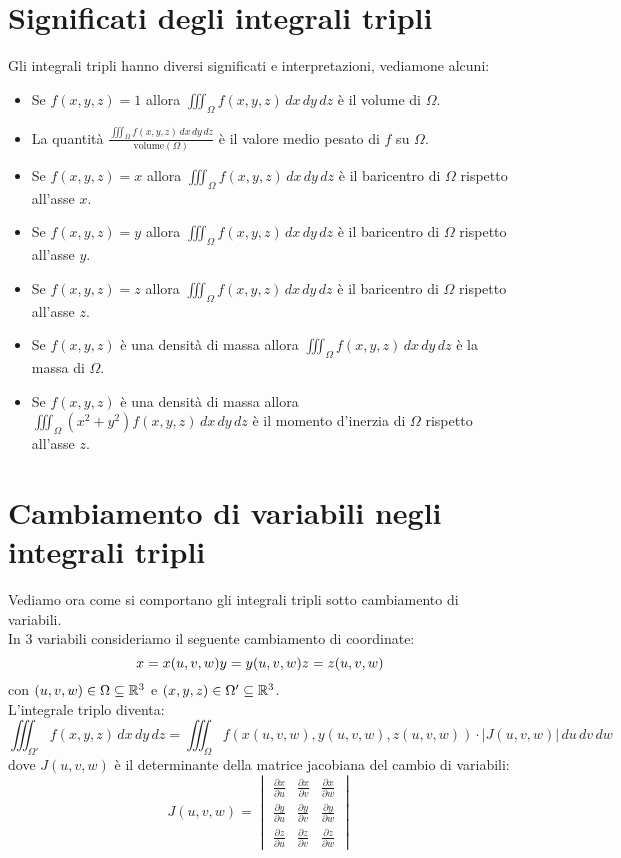 \section{Significati degli integrali tripli}
Gli integrali tripli hanno diversi significati e interpretazioni, vediamone alcuni:
\begin{itemize}
  \item Se $f(x,y,z)=1$ allora $\iiint_{\Omega} f(x,y,z) \, dx \, dy \, dz$ è il volume di $\Omega$.
  \item La quantità $\frac{\iiint_{\Omega} f(x,y,z) \, dx \, dy \, dz}{\text{volume}(\Omega)}$ è il valore medio pesato di $f$ su $\Omega$.
  \item Se $f(x,y,z)=x$ allora $\iiint_{\Omega} f(x,y,z) \, dx \, dy \, dz$ è il baricentro di $\Omega$ rispetto all'asse $x$.
  \item Se $f(x,y,z)=y$ allora $\iiint_{\Omega} f(x,y,z) \, dx \, dy \, dz$ è il baricentro di $\Omega$ rispetto all'asse $y$.
  \item Se $f(x,y,z)=z$ allora $\iiint_{\Omega} f(x,y,z) \, dx \, dy \, dz$ è il baricentro di $\Omega$ rispetto all'asse $z$.
  \item Se $f(x,y,z)$ è una densità di massa allora $\iiint_{\Omega} f(x,y,z) \, dx \, dy \, dz$ è la massa di $\Omega$.
  \item Se $f(x,y,z)$ è una densità di massa allora $\iiint_{\Omega} (x^2 + y^2) f(x,y,z) \, dx \, dy \, dz$ è il momento d'inerzia di $\Omega$ rispetto all'asse $z$.
\end{itemize}


\section{Cambiamento di variabili negli integrali tripli}
Vediamo ora come si comportano gli integrali tripli sotto cambiamento di variabili.\\
In 3 variabili consideriamo il seguente cambiamento di coordinate:
\[
  x = x(u,v,w)\\
  y = y(u,v,w)\\
  z = z(u,v,w)
\]
con $(u,v,w) \in \Omega \subseteq \mathbb{R}^3$ e $(x,y,z) \in \Omega' \subseteq \mathbb{R}^3$.\\
L'integrale triplo diventa:
\[
\iiint_{\Omega'} f(x,y,z) \, dx \, dy \, dz = \iiint_{\Omega} f(x(u,v,w),y(u,v,w),z(u,v,w)) \cdot |J(u,v,w)| \, du \, dv \, dw
\]
dove $J(u,v,w)$ è il determinante della matrice jacobiana del cambio di variabili:
\[
J(u,v,w) = \begin{vmatrix}
  \frac{\partial x}{\partial u} & \frac{\partial x}{\partial v} & \frac{\partial x}{\partial w}\\
  \frac{\partial y}{\partial u} & \frac{\partial y}{\partial v} & \frac{\partial y}{\partial w}\\
  \frac{\partial z}{\partial u} & \frac{\partial z}{\partial v} & \frac{\partial z}{\partial w}
\end{vmatrix}
\]

